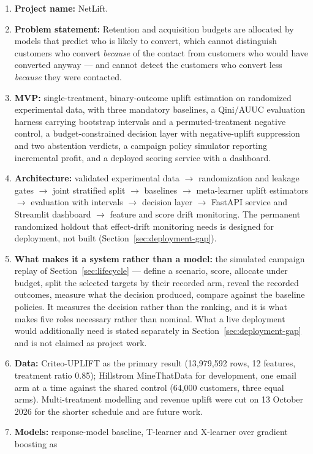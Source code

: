 \documentclass[11pt,a4paper]{article}
\begin{document}
\begin{keybox}
\begin{enumerate}
\item \textbf{Project name:} NetLift.
\item \textbf{Problem statement:} Retention and acquisition budgets are allocated by models that
predict who is likely to convert, which cannot distinguish customers who convert \emph{because} of
the contact from customers who would have converted anyway --- and cannot detect the customers who
convert less \emph{because} they were contacted.
\item \textbf{MVP:} single-treatment, binary-outcome uplift estimation on randomized experimental
data, with three mandatory baselines, a Qini/AUUC evaluation harness carrying bootstrap intervals
and a permuted-treatment negative control, a budget-constrained decision layer with negative-uplift
suppression and two abstention verdicts, a campaign policy simulator reporting incremental profit,
and a deployed scoring service with a dashboard.
\item \textbf{Architecture:} validated experimental data $\to$ randomization and leakage gates $\to$
joint stratified split $\to$ baselines $\to$ meta-learner uplift estimators $\to$ evaluation with
intervals $\to$ decision layer $\to$ FastAPI service and Streamlit dashboard $\to$ feature and
score drift monitoring. The permanent randomized holdout that effect-drift monitoring needs is
designed for deployment, not built (Section~\ref{sec:deployment-gap}).
\item \textbf{What makes it a system rather than a model:} the simulated campaign replay of
Section~\ref{sec:lifecycle} --- define a scenario, score, allocate under budget, split the selected
targets by their recorded arm, reveal the recorded outcomes, measure what the decision produced,
compare against the baseline policies.
It measures the decision rather than the ranking, and it is what makes five roles necessary rather
than nominal. What a live deployment would additionally need is stated separately in
Section~\ref{sec:deployment-gap} and is not claimed as project work.
\item \textbf{Data:} Criteo-UPLIFT as the primary result (13{,}979{,}592 rows, 12 features,
treatment ratio 0.85); Hillstrom MineThatData for development, one email arm at a time against
the shared control (64{,}000 customers, three equal arms). Multi-treatment modelling and revenue
uplift were cut on 13 October 2026 for the shorter schedule and are future work.
\item \textbf{Models:} response-model baseline, T-learner and X-learner over gradient boosting as

\end{enumerate}
\end{keybox}
\end{document}
